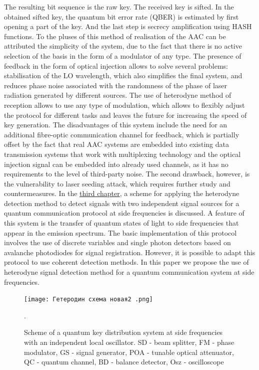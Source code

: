 {The resulting bit sequence is the raw key. The received key is sifted. In the obtained sifted key, the quantum bit error rate (QBER) is estimated by first opening a part of the key. And the last step is secrecy amplification using HASH functions.
To the pluses of this method of realisation of the AAC can be attributed the simplicity of the system, due to the fact that there is no active selection of the basis in the form of a modulator of any type. The presence of feedback in the form of optical injection allows to solve several problems: stabilisation of the LO wavelength, which also simplifies the final system, and reduces phase noise associated with the randomness of the phase of laser radiation generated by different sources. The use of heterodyne method of reception allows to use any type of modulation, which allows to flexibly adjust the protocol for different tasks and leaves the future for increasing the speed of key generation.
\newline The disadvantages of this system include the need for an additional fibre-optic communication channel for feedback, which is partially offset by the fact that real AAC systems are embedded into existing data transmission systems that work with multiplexing technology and the optical injection signal can be embedded into already used channels, as it has no requirements to the level of third-party noise. The second drawback, however, is the vulnerability to laser seeding attack, which requires further study and countermeasures. 
\newpage In the \underline{third chapter}, a scheme for applying the heterodyne detection method to detect \cite{brunner2017,delange1968,kuri2003} signals with two independent signal sources \cite{hajomer2024,shao2022} for a quantum communication protocol at side frequencies is discussed. A feature of this system is the transfer of quantum states of light to side frequencies that appear in the emission spectrum. The basic implementation of this protocol involves the use of discrete variables and single photon detectors based on avalanche photodiodes for signal registration. However, it is possible to adapt this protocol to use coherent detection methods\cite{samsonov2021,fadeev2024}. 
\newline In this paper we propose the use of heterodyne signal detection method for a quantum communication system at side frequencies.
\begin{figure}
    \centering
    \texttt{[image: Гетеродин схема новая2 .png]}
    \caption{Scheme of a quantum key distribution system at side frequencies with an independent local oscillator. SD - beam splitter, FM - phase modulator, GS - signal generator, POA - tunable optical attenuator, QC - quantum channel, BD - balance detector, Osz - oscilloscope}.

\end{figure}}
